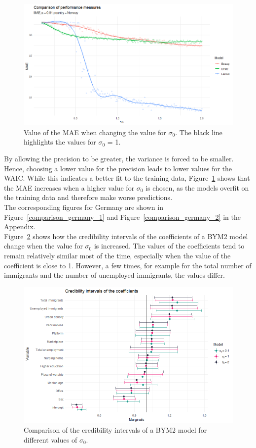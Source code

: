 \clearpage
\begin{figure}[H]
  \centering
  \includegraphics[width = \textwidth]{mae_norway.png}
  \caption{Value of the MAE when changing the value for $\sigma_0$. The black line highlights the values for $\sigma_0$ = 1.}
  \label{comparison_norway_2}
\end{figure}
By allowing the precision to be greater, the variance is forced to be smaller. Hence, choosing a lower value for the precision leads to lower values for the WAIC. While this indicates a better fit to the training data, Figure~\ref{comparison_norway_2} shows that the MAE increases when a higher value for $\sigma_0$ is chosen, as the models overfit on the training data and therefore make worse predictions. \\
The corresponding figures for Germany are shown in Figure~\ref{comparison_germany_1} and Figure~\ref{comparison_germany_2} in the Appendix. \\
Figure~\ref{comparison_norway_5} shows how the credibility intervals of the coefficients of a BYM2 model change when the value for $\sigma_0$ is increased. The values of the coefficients tend to remain relatively similar most of the time, especially when the value of the coefficient is close to 1. However, a few times, for example for the total number of immigrants and the number of unemployed immigrants, the values differ. \clearpage
\begin{figure}[H]
  \centering
  \includegraphics[width = \textwidth]{intervals_prior_norway.png}
  \caption{Comparison of the credibility intervals of a BYM2 model for different values of $\sigma_0$.}
  \label{comparison_norway_5}
\end{figure}
